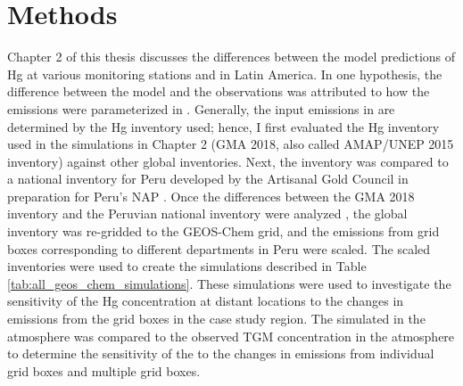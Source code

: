 \section{Methods}\label{c3_methods}
\begin{flushleft}
    Chapter 2 of this thesis discusses the differences between the \gc model predictions of Hg at various monitoring stations and in Latin America. In one hypothesis, the difference between the model and the observations was attributed to how the emissions were parameterized in \gc. Generally, the input emissions in \gc are determined by the Hg inventory used; hence, I first evaluated the Hg inventory used in the simulations in Chapter 2 (GMA 2018, also called AMAP/UNEP 2015 inventory) against other global inventories. Next, the inventory was compared to a national inventory for Peru developed by the Artisanal Gold Council in preparation for Peru's NAP \cite{agc_reporte_2017}. Once the differences between the GMA 2018 inventory\cite{steenhuisen_development_2019} and the Peruvian national inventory were analyzed \cite{agc_reporte_2017}, the global inventory was re-gridded to the GEOS-Chem grid, and the emissions from grid boxes corresponding to different departments in Peru were scaled. The scaled inventories were used to create the simulations described in Table \ref{tab:all_geos_chem_simulations}. These simulations were used to investigate the sensitivity of the Hg concentration at distant locations to the changes in emissions from the grid boxes in the case study region. The simulated \hgc in the atmosphere was compared to the observed TGM concentration in the atmosphere to determine the sensitivity of the \hgc to the changes in emissions from individual grid boxes and multiple grid boxes. 
\end{flushleft}

